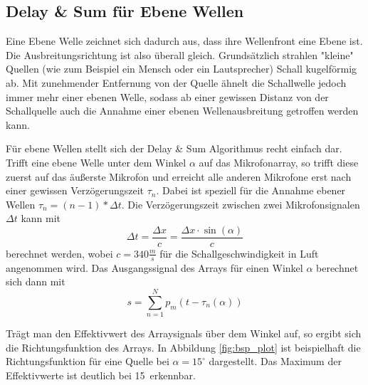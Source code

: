 \subsection{Delay \& Sum für Ebene Wellen}
	
	Eine Ebene Welle zeichnet sich dadurch aus, dass ihre Wellenfront eine Ebene ist. Die Ausbreitungsrichtung ist also überall gleich.
	Grundsätzlich strahlen "kleine" Quellen (wie zum Beispiel ein Mensch oder ein Lautsprecher) Schall kugelförmig ab. Mit zunehmender Entfernung von der Quelle ähnelt die Schallwelle jedoch immer mehr einer ebenen Welle, sodass ab einer gewissen Distanz von der Schallquelle auch die Annahme einer ebenen Wellenausbreitung getroffen werden kann.
	
	Für ebene Wellen stellt sich der Delay \& Sum Algorithmus recht einfach dar. Trifft eine ebene Welle unter dem Winkel $\alpha$ auf das Mikrofonarray, so trifft diese zuerst auf das äußerste Mikrofon und erreicht alle anderen Mikrofone erst nach einer gewissen Verzögerungszeit $\tau_n$.
	Dabei ist speziell für die Annahme ebener Wellen $\tau_n = (n - 1) * \Delta t$. Die Verzögerungszeit zwischen zwei Mikrofonsignalen $\Delta t$ kann mit 
	\begin{equation}
		\Delta t = \frac{\Delta x}{c} = \frac{\Delta x \cdot \sin(\alpha)}{c}
	\end{equation}
	berechnet werden, wobei $c = 340 \frac{m}{s}$ für die Schallgeschwindigkeit in Luft angenommen wird.
	Das Ausgangssignal des Arrays für einen Winkel $\alpha$ berechnet sich dann mit
	\begin{equation}
		s = \sum_{n=1}^{N} p_m(t - \tau_n(\alpha))
		\label{eq:das_plane}
	\end{equation}
	
	Trägt man den Effektivwert des Arraysignals über dem Winkel auf, so ergibt sich die Richtungsfunktion des Arrays. In Abbildung \ref{fig:bsp_plot} ist beispielhaft die Richtungsfunktion für eine Quelle bei $\alpha = 15^{\circ}$ dargestellt.
	Das Maximum der Effektivwerte ist deutlich bei 15\textdegree\ erkennbar.
	
